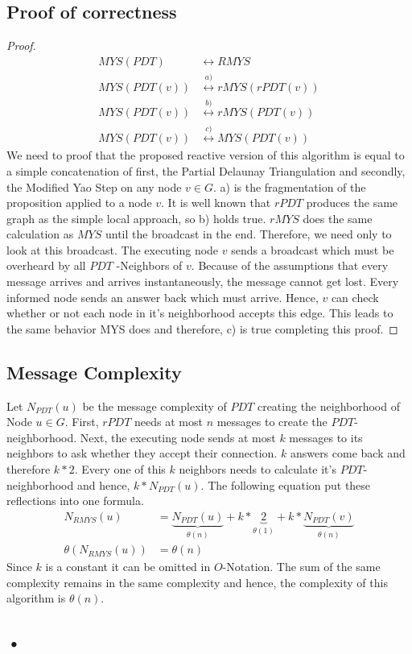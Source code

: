 \subsection{Proof of correctness}
\begin{proof}
\begin{equation*}
\begin{split}
	MYS(PDT) &\leftrightarrow RMYS\\
	MYS(PDT(v)) &\stackrel{a)}{\leftrightarrow} rMYS(rPDT(v)) \\
    MYS(PDT(v)) &\stackrel{b)}{\leftrightarrow} rMYS(PDT(v))\\
    MYS(PDT(v)) &\stackrel{c)}{\leftrightarrow} MYS(PDT(v)) 
\end{split}
\end{equation*}
We need to proof that the proposed reactive version of this algorithm is equal to a simple concatenation of first, the Partial Delaunay Triangulation and secondly, the Modified Yao Step on any node $v \in G$.
a) is the fragmentation of the proposition applied to a node $v $.
It is well known that $rPDT $ produces the same graph as the simple local approach, so b) holds true.
$rMYS $ does the same calculation as $MYS $ until the broadcast in the end.
Therefore, we need only to look at this broadcast.
The executing node $v $ sends a broadcast which must be overheard by all $PDT $ -Neighbors of $v $.
Because of the assumptions that every message arrives and arrives instantaneously, the message cannot get lost.
Every informed node sends an answer back which must arrive.
Hence, $v $ can check whether or not each node in it's neighborhood accepts this edge.
This leads to the same behavior MYS does and therefore, c) is true completing this proof.
\end{proof}

\subsection{Message Complexity}
Let $N_{PDT}(u) $ be the message complexity of $PDT $ creating the neighborhood of Node $u \in G$.
First, $rPDT $ needs at most $n $ messages to create the $PDT $-neighborhood.
Next, the executing node sends at most $k $ messages to its neighbors to ask whether they accept their connection.
$k $ answers come back and therefore $k * 2 $.
Every one of this $k $ neighbors needs to calculate it's $PDT $-neighborhood and hence, $k*N_{PDT}(u) $.
The following equation put these reflections into one formula.
\begin{equation*}
\begin{split}
N_{RMYS}(u) &= \underbrace{N_{PDT}(u)}_{\theta (n)} +k *\underbrace{2}_{\theta (1)} + k*\underbrace{N_{PDT}(v)}_{\theta (n)} \\
\theta (N_{RMYS}(u)) &= \theta (n) 
\end{split}
\end{equation*}
Since $k $ is a constant it can be omitted in $O $-Notation.
The sum of the same complexity remains in the same complexity and hence, the complexity of this algorithm is $\theta (n) $.

\subsection{•}
